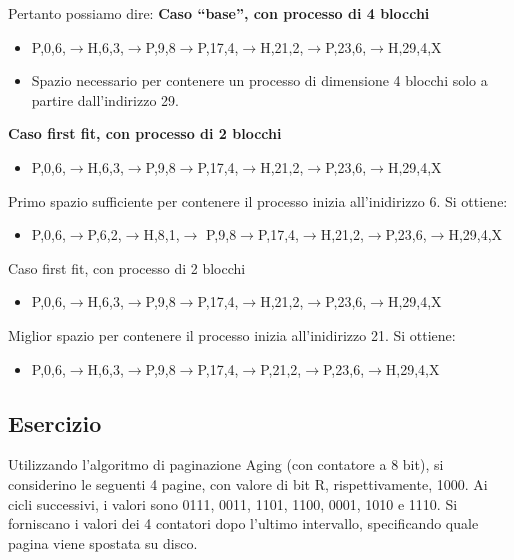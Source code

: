 \documentclass{article}
\begin{document}
Pertanto possiamo dire:
\textbf{Caso “base”, con processo di 4 blocchi}
\begin{itemize}
\item P,0,6,$\rightarrow$H,6,3,$\rightarrow$P,9,8$\rightarrow$P,17,4,$\rightarrow$H,21,2,$\rightarrow$P,23,6,$\rightarrow$H,29,4,X
\item Spazio necessario per contenere un processo di dimensione 4 blocchi solo a partire dall’indirizzo 29.

\end{itemize}
\textbf{Caso first fit, con processo di 2 blocchi}
 
\begin{itemize}
\item P,0,6,$\rightarrow$H,6,3,$\rightarrow$P,9,8$\rightarrow$P,17,4,$\rightarrow$H,21,2,$\rightarrow$P,23,6,$\rightarrow$H,29,4,X
\end{itemize}
 Primo spazio sufficiente per contenere il processo inizia all’inidirizzo 6.
 Si ottiene:

\begin{itemize}
\item  P,0,6,$\rightarrow$P,6,2,$\rightarrow$H,8,1,$\rightarrow$ P,9,8$\rightarrow$P,17,4,$\rightarrow$H,21,2,$\rightarrow$P,23,6,$\rightarrow$H,29,4,X
\end{itemize}
 Caso first fit, con processo di 2 blocchi

\begin{itemize}
\item  P,0,6,$\rightarrow$H,6,3,$\rightarrow$P,9,8$\rightarrow$P,17,4,$\rightarrow$H,21,2,$\rightarrow$P,23,6,$\rightarrow$H,29,4,X
\end{itemize}
 Miglior spazio per contenere il processo inizia all’inidirizzo 21.
 Si ottiene:

\begin{itemize}
\item  P,0,6,$\rightarrow$H,6,3,$\rightarrow$P,9,8$\rightarrow$P,17,4,$\rightarrow$P,21,2,$\rightarrow$P,23,6,$\rightarrow$H,29,4,X
\end{itemize}


\subsection{Esercizio}
Utilizzando l’algoritmo di paginazione Aging (con contatore a 8 bit), si considerino le seguenti 4 pagine, con valore di bit R, rispettivamente, 1000. Ai cicli successivi, i valori sono 0111, 0011, 1101, 1100, 0001, 1010 e 1110. Si forniscano i valori dei 4 contatori dopo l’ultimo intervallo, specificando quale
pagina viene spostata su disco.
\end{document}
